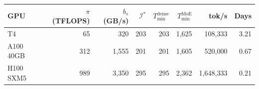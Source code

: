 \begin{tabular}{lrrrrrrr}
\toprule
GPU & $\pi$ (TFLOPS) & $b_s$ (GB/s) & $\mathcal{I}^\ast$ & $T_{\min}^{\text{dense}}$ & $T_{\min}^{\text{MoE}}$ & tok/s & Days \\
\midrule
T4 & 65 & 320 & 203 & 203 & 1,625 & 108,333 & 3.21 \\
A100 40GB & 312 & 1,555 & 201 & 201 & 1,605 & 520,000 & 0.67 \\
H100 SXM5 & 989 & 3,350 & 295 & 295 & 2,362 & 1,648,333 & 0.21 \\
\bottomrule
\end{tabular}

